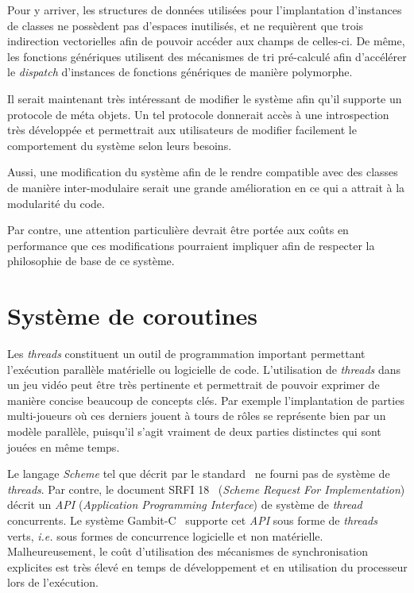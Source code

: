 \documentclass[12pt,twoside,letterpaper,francais]{book}
\newcommand{\ie}{{\textit{i.e. }}}
\newcommand{\Schemelang}{{\textit{Scheme }}}
\begin{document}
Pour y arriver, les structures de données utilisées pour
l'implantation d'instances de classes ne possèdent pas d'espaces
inutilisés, et ne requièrent que trois indirection vectorielles afin
de pouvoir accéder aux champs de celles-ci. De même, les fonctions
génériques utilisent des mécanismes de tri pré-calculé afin
d'accélérer le \textit{dispatch} d'instances de fonctions génériques
de manière polymorphe. 

Il serait maintenant très intéressant de modifier le système afin
qu'il supporte un protocole de méta objets. Un tel protocole donnerait
accès à une introspection très développée et permettrait aux
utilisateurs de modifier facilement le comportement du système selon
leurs besoins. 

Aussi, une modification du système afin de le rendre compatible avec
des classes de manière inter-modulaire serait une grande amélioration
en ce qui a attrait à la modularité du code.

Par contre, une attention particulière devrait être portée aux coûts
en performance que ces modifications pourraient impliquer afin de
respecter la philosophie de base de ce système.

\clearpage

\chapter{Système de coroutines} \label{Chap:corout}
Les \textit{threads} constituent un outil de programmation important
permettant l'exécution parallèle matérielle ou logicielle de
code. L'utilisation de \textit{threads} dans un jeu vidéo peut être
très pertinente et permettrait de pouvoir exprimer de manière concise
beaucoup de concepts clés. Par exemple l'implantation de parties
multi-joueurs où ces derniers jouent à tours de rôles se représente
bien par un modèle parallèle, puisqu'il s'agit vraiment de deux
parties distinctes qui sont jouées en même temps. 

Le langage \Schemelang tel que décrit par le standard~\cite{R5RS} ne fourni
pas de système de \textit{threads}. Par contre, le document SRFI
18~\cite{SRFI18} (\textit{Scheme Request For Implementation}) décrit
un \textit{API} (\textit{Application Programming Interface}) de
système de \textit{thread} concurrents. Le système
Gambit-C~\cite{Gambit4} supporte cet \textit{API} sous forme de
\textit{threads} verts, \ie  sous formes de concurrence logicielle et
non matérielle. Malheureusement, le coût d'utilisation des mécanismes
de synchronisation explicites est très élevé en temps de développement
et en utilisation du processeur lors de l'exécution.
\end{document}
